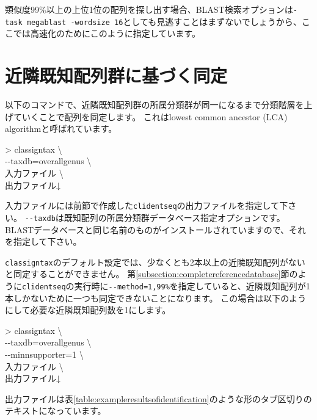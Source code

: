 \documentclass[titlepage,10pt,a4paper]{jsbook}
\newenvironment{cmd}{\begin{oframed}\raggedright\ttfamily\footnotesize\setlength{\baselineskip}{1.4em}}{\end{oframed}\vspace{-1em}}
\begin{document}
類似度99\%以上の上位1位の配列を探し出す場合、BLAST検索オプションは\texttt{-task megablast -word{\textunderscore}size 16}としても見逃すことはまずないでしょうから、ここでは高速化のためにこのように指定しています。

\section{近隣既知配列群に基づく同定}

以下のコマンドで、近隣既知配列群の所属分類群が同一になるまで分類階層を上げていくことで配列を同定します。
これはlowest common ancestor (LCA) algorithmと呼ばれています\citep{Huson2007}。

\begin{cmd}
{\textgreater} classigntax {\textbackslash}\\
{-}{-}taxdb=overall{\textunderscore}genus {\textbackslash}\\
入力ファイル {\textbackslash}\\
出力ファイル↓
\end{cmd}

入力ファイルには前節で作成した\texttt{clidentseq}の出力ファイルを指定して下さい。
\texttt{{-}{-}taxdb}は既知配列の所属分類群データベース指定オプションです。
BLASTデータベースと同じ名前のものがインストールされていますので、それを指定して下さい。

\texttt{classigntax}のデフォルト設定では、少なくとも2本以上の近隣既知配列がないと同定することができません。
第\ref{subsection:completereferencedatabase}節のように\texttt{clidentseq}の実行時に\texttt{{-}{-}method=1,99\%}を指定していると、近隣既知配列が1本しかないために一つも同定できないことになります。
この場合は以下のようにして必要な近隣既知配列数を1にします。

\begin{cmd}
{\textgreater} classigntax {\textbackslash}\\
{-}{-}taxdb=overall{\textunderscore}genus {\textbackslash}\\
{-}{-}minnsupporter=1 {\textbackslash}\\
入力ファイル {\textbackslash}\\
出力ファイル↓
\end{cmd}

出力ファイルは表\ref{table:exampleresultsofidentification}のような形のタブ区切りのテキストになっています。
\end{document}
